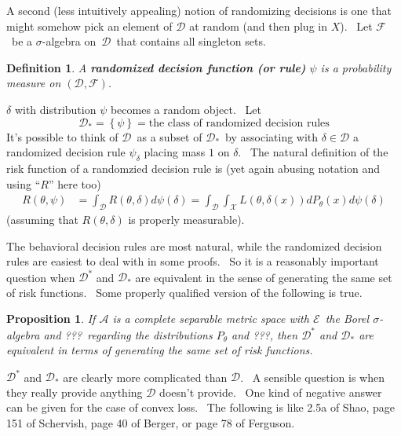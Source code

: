 \documentclass{article}
\newtheorem{definition}[theorem]{Definition}
\newtheorem{proposition}[theorem]{Proposition}
\begin{document}
A second (less intuitively appealing) notion of randomizing decisions is one
that might somehow pick an element of $\mathcal{D}$ at random (and then plug
in $X$). \ Let $\mathcal{F}$\ be a $\sigma$-algebra on\ $\mathcal{D}$\ that
contains all singleton sets.

\begin{definition}
\label{randomized}A \textbf{randomized decision function (or rule)} $\psi$ is
a probability measure on $\left(  \mathcal{D},\mathcal{F}\right)  $.
\end{definition}

$\delta$ with distribution $\psi$ becomes a random object. \ Let%
\[
\mathcal{D}_{\ast}=\left\{  \psi\right\}  =\text{the class of randomized
decision rules}%
\]
It's possible to think of $\mathcal{D}$\ as a subset of $\mathcal{D}_{\ast}%
$\ by associating with $\delta\in\mathcal{D}$ a randomized decision rule
$\psi_{\delta}$ placing mass $1$ on $\delta$. \ The natural definition of the
risk function of a randomzied decision rule is (yet again abusing notation and
using ``$R$'' here too)%
\begin{align*}
R\left(  \theta,\psi\right)   &  =\int_{\mathcal{D}}R\left(  \theta
,\delta\right)  d\psi\left(  \delta\right)  =\int_{\mathcal{D}}\int_{\mathcal{X}}L\left(  \theta,\delta\left(
x\right)  \right)  dP_{\theta}\left(  x\right)  d\psi\left(  \delta\right)
\end{align*}
(assuming that $R\left(  \theta,\delta\right)  $ is properly measurable).

The behavioral decision rules are most natural, while the randomized decision
rules are easiest to deal with in some proofs. \ So it is a reasonably
important question when $\mathcal{D}^{\ast}$ and $\mathcal{D}_{\ast}$ are
equivalent in the sense of generating the same set of risk functions. \ Some
properly qualified version of the following is true.

\begin{proposition}
\label{equivrandomized}If $\mathcal{A}$ is a complete separable metric space
with $\mathcal{E}$\ the Borel $\sigma$-algebra and ???\ regarding the
distributions $P_{\theta}$ and ???, then $\mathcal{D}^{\ast}$ and
$\mathcal{D}_{\ast}$ are equivalent in terms of generating the same set of
risk functions.
\end{proposition}

$\mathcal{D}^{\ast}$ and $\mathcal{D}_{\ast}$ are clearly more complicated
than $\mathcal{D}$. \ A sensible question is when they really provide anything
$\mathcal{D}$ doesn't provide. \ One kind of negative answer can be given for
the case of convex loss. \ The following is like 2.5a of Shao, page 151 of
Schervish, page 40 of Berger, or page 78 of Ferguson.
\end{document}
